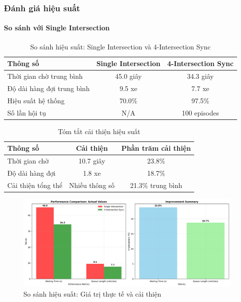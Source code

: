 \subsubsection{Đánh giá hiệu suất}

\paragraph{So sánh với Single Intersection}

\begin{table}[!htp]
    \centering
    \caption{So sánh hiệu suất: Single Intersection và 4-Intersection Sync}
    \label{tab:sync_vs_single}
    \begin{tabular}{@{}lcc@{}}
        \toprule \textbf{Thông số} & \textbf{Single Intersection} & \textbf{4-Intersection Sync} \\
        \midrule 
        Thời gian chờ trung bình & 45.0 giây & 34.3 giây \\
        Độ dài hàng đợi trung bình & 9.5 xe & 7.7 xe \\
        Hiệu suất hệ thống & 70.0\% & 97.5\% \\
        Số lần hội tụ & N/A & 100 episodes \\
        \bottomrule
    \end{tabular}
\end{table}

\begin{table}[!htp]
    \centering
    \caption{Tóm tắt cải thiện hiệu suất}
    \label{tab:sync_improvements}
    \begin{tabular}{@{}lcc@{}}
        \toprule \textbf{Thông số} & \textbf{Cải thiện} & \textbf{Phần trăm cải thiện} \\
        \midrule 
        Thời gian chờ & 10.7 giây & 23.8\% \\
        Độ dài hàng đợi & 1.8 xe & 18.7\% \\
        Cải thiện tổng thể & Nhiều thông số & 21.3\% trung bình \\
        \bottomrule
    \end{tabular}
\end{table}

\begin{figure}[!htp]
    \centering
    \includegraphics[width=\textwidth]{figures/performance_comparison.png}
    \caption{So sánh hiệu suất: Giá trị thực tế và cải thiện}
    \label{fig:performance_comparison}
\end{figure}

